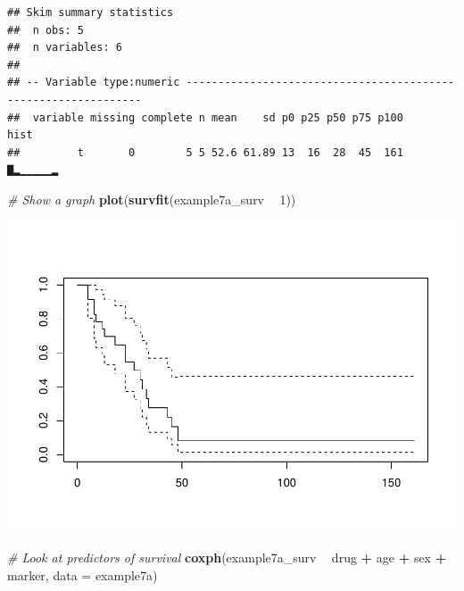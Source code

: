 \documentclass[]{book}
\newenvironment{Shaded}{\begin{snugshade}}{\end{snugshade}}
\newcommand{\CommentTok}[1]{\textcolor[rgb]{0.56,0.35,0.01}{\textit{#1}}}
\newcommand{\DataTypeTok}[1]{\textcolor[rgb]{0.13,0.29,0.53}{#1}}
\newcommand{\DecValTok}[1]{\textcolor[rgb]{0.00,0.00,0.81}{#1}}
\newcommand{\KeywordTok}[1]{\textcolor[rgb]{0.13,0.29,0.53}{\textbf{#1}}}
\newcommand{\NormalTok}[1]{#1}
\newcommand{\OperatorTok}[1]{\textcolor[rgb]{0.81,0.36,0.00}{\textbf{#1}}}
\newcommand{\StringTok}[1]{\textcolor[rgb]{0.31,0.60,0.02}{#1}}
\begin{document}
\begin{Shaded}
\end{Shaded}

\begin{verbatim}
## Skim summary statistics
##  n obs: 5 
##  n variables: 6 
## 
## -- Variable type:numeric ---------------------------------------------------------------
##  variable missing complete n mean    sd p0 p25 p50 p75 p100     hist
##         t       0        5 5 52.6 61.89 13  16  28  45  161 ▇▂▁▁▁▁▁▂
\end{verbatim}

\begin{Shaded}
\begin{Highlighting}[]
\CommentTok{# Show a graph}
\KeywordTok{plot}\NormalTok{(}\KeywordTok{survfit}\NormalTok{(example7a_surv }\OperatorTok{~}\StringTok{ }\DecValTok{1}\NormalTok{))}
\end{Highlighting}
\end{Shaded}

\includegraphics{07-week7_files/figure-latex/week7k-1.pdf}

\begin{Shaded}
\begin{Highlighting}[]
\CommentTok{# Look at predictors of survival}
\KeywordTok{coxph}\NormalTok{(example7a_surv }\OperatorTok{~}\StringTok{ }\NormalTok{drug }\OperatorTok{+}\StringTok{ }\NormalTok{age }\OperatorTok{+}\StringTok{ }\NormalTok{sex }\OperatorTok{+}\StringTok{ }\NormalTok{marker, }\DataTypeTok{data =}\NormalTok{ example7a)}
\end{Highlighting}
\end{Shaded}
\end{document}
